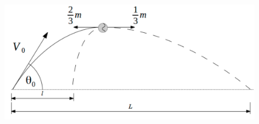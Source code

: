 \documentclass[letterpaper,11pt]{article}
\begin{document}
\begin{enumerate}
\begin{multicols}{2}
\columnbreak

\begin{figure}[H]
    \centering
    \includegraphics[width=0.9\linewidth]{2021-2/img/aux11/proyectil.PNG}
\end{figure}

\end{multicols}

%   

\end{enumerate}
\end{document}
